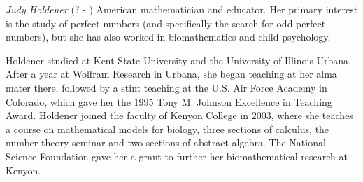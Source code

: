\documentclass[12pt]{article}
\begin{document}

\emph{Judy Holdener} (? - ) American mathematician and educator. Her primary interest is the study of perfect numbers (and specifically the search for odd perfect numbers), but she has also worked in biomathematics and child psychology.

Holdener studied at Kent State University and the University of Illinois-Urbana. After a year at Wolfram Research in Urbana, she began teaching at her alma mater there, followed by a stint teaching at the U.S. Air Force Academy in Colorado, which gave her the 1995 Tony M. Johnson Excellence in Teaching Award. Holdener joined the faculty of Kenyon College in 2003, where she teaches a course on mathematical models for biology, three sections of calculus, the number theory seminar and two sections of abstract algebra. The National Science Foundation gave her a grant to further her biomathematical research at Kenyon.

\end{document}
